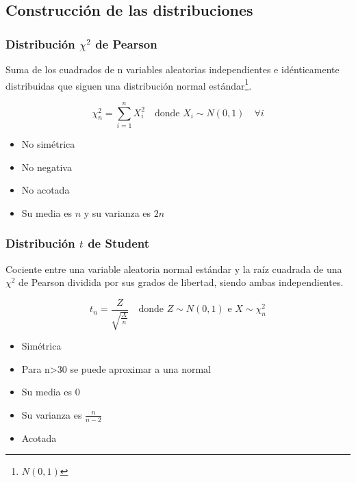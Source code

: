 \documentclass[a4paper,12pt]{article}
\newcommand{\ecuacion}[1]{\ensuremath{#1}}
\begin{document}
\subsection{Construcción de las distribuciones}

\subsubsection{Distribución \ecuacion{\chi^2} de Pearson}

Suma de los cuadrados de n variables aleatorias independientes e idénticamente distribuidas que siguen una distribución normal estándar\footnote{\ecuacion{N(0,1)}}.

\begin{equation}
    \chi^2_n = \sum_{i=1}^{n}X_i^2 \quad \text{donde } X_i \sim N(0,1) \quad \forall i
\end{equation}

\begin{itemize}
    \item No simétrica
    \item No negativa
    \item No acotada
    \item Su media es \ecuacion{n} y su varianza es \ecuacion{2n}
\end{itemize}

\subsubsection{Distribución \ecuacion{t} de Student}

Cociente entre una variable aleatoria normal estándar y la raíz cuadrada de una \ecuacion{\chi^2} de Pearson dividida por sus grados de libertad, siendo ambas independientes.

\begin{equation}
    t_n = \frac{Z}{\sqrt{\frac{X}{n}}} \quad \text{donde } Z \sim N(0,1) \text{ e } X \sim \chi^2_n
\end{equation}

\begin{itemize}
    \item Simétrica
    \item Para n>30 se puede aproximar a una normal
    \item Su media es 0
    \item Su varianza es \ecuacion{\frac{n}{n-2}}
    \item Acotada
\end{itemize}
\end{document}
